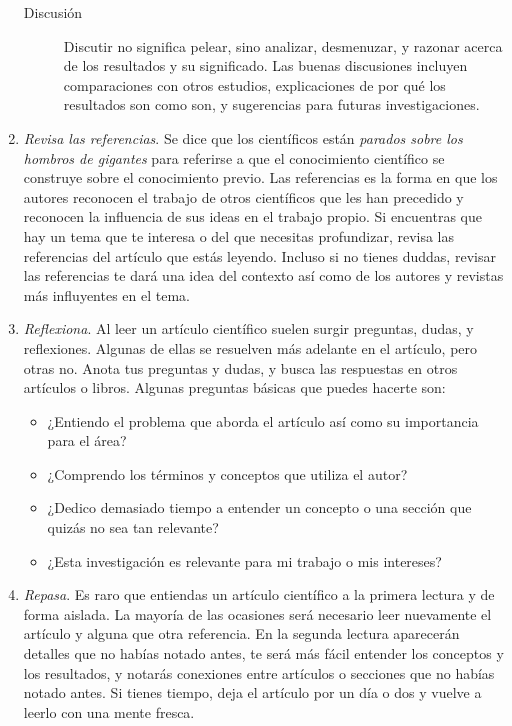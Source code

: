 \begin{enumerate}
\begin{description}
		      \item[Discusión] Discutir no significa pelear, sino analizar, desmenuzar, y razonar acerca de los resultados y su significado.
		            Las buenas discusiones incluyen comparaciones con otros estudios, explicaciones de por qué los resultados son como son, y sugerencias para futuras investigaciones.
	      \end{description} \item \emph{Revisa las referencias}.
	      Se dice que los científicos están \emph{parados sobre los hombros de gigantes} para referirse a que el conocimiento científico se construye sobre el conocimiento previo.
	      Las referencias es la forma en que los autores reconocen el trabajo de otros científicos que les han precedido y reconocen la influencia de sus ideas en el trabajo propio.
	      Si encuentras que hay un tema que te interesa o del que necesitas profundizar, revisa las referencias del artículo que estás leyendo.
	      Incluso si no tienes duddas, revisar las referencias te dará una idea del contexto así como de los autores y revistas más influyentes en el tema.
	\item \emph{Reflexiona}.
	      Al leer un artículo científico suelen surgir preguntas, dudas, y reflexiones.
	      Algunas de ellas se resuelven más adelante en el artículo, pero otras no.
	      Anota tus preguntas y dudas, y busca las respuestas en otros artículos o libros.
	      Algunas preguntas básicas que puedes hacerte son: \begin{itemize} \item ¿Entiendo el problema que aborda el artículo así como su importancia para el área?
		      \item ¿Comprendo los términos y conceptos que utiliza el autor?
		      \item ¿Dedico demasiado tiempo a entender un concepto o una sección que quizás no sea tan relevante?
		      \item ¿Esta investigación es relevante para mi trabajo o mis intereses?
	      \end{itemize} \item \emph{Repasa}.
	      Es raro que entiendas un artículo científico a la primera lectura y de forma aislada.
	      La mayoría de las ocasiones será necesario leer nuevamente el artículo y alguna que otra referencia.
	      En la segunda lectura aparecerán detalles que no habías notado antes, te será más fácil entender los conceptos y los resultados, y notarás conexiones entre artículos o secciones que no habías notado antes.
	      Si tienes tiempo, deja el artículo por un día o dos y vuelve a leerlo con una mente fresca.
\end{enumerate}


